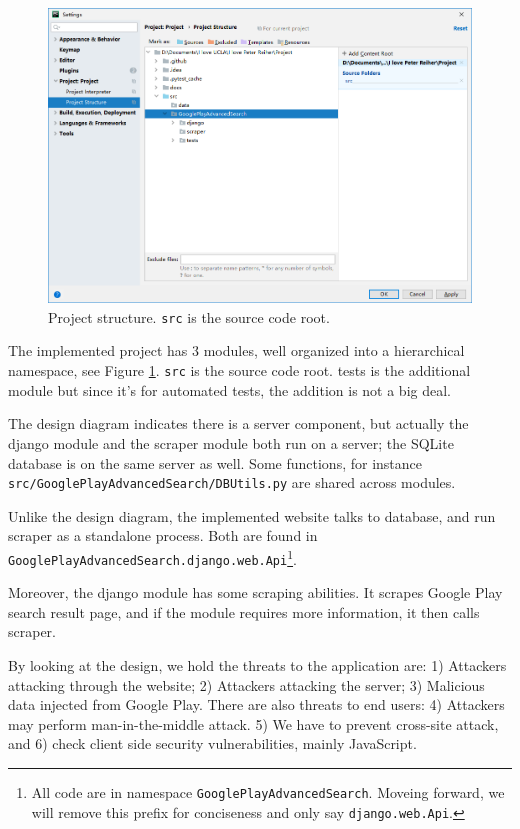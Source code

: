 \documentclass[12pt, a4paper]{article}
\newcommand{\code}[1]{\texttt{#1}}
\begin{document}
\begin{figure}[ht]
\centering
\includegraphics[width=\textwidth]{project-structure.png}
\caption{Project structure. \code{src} is the source code root.}
\label{fig:project-structure}
\end{figure}

The implemented project has 3 modules, well organized into a hierarchical namespace, see Figure \ref{fig:project-structure}. \code{src} is the source code root. tests is the additional module but since it's for automated tests, the addition is not a big deal.

The design diagram indicates there is a server component, but actually the django module and the scraper module both run on a server; the SQLite database is on the same server as well. Some functions, for instance \code{src/GooglePlayAdvancedSearch/DBUtils.py} are shared across modules. 

Unlike the design diagram, the implemented website talks to database, and run scraper as a standalone process. Both are found in \linebreak[4]
\code{GooglePlayAdvancedSearch\linebreak[0].django.web.Api}\footnote{All code are in namespace \code{GooglePlayAdvancedSearch}. Moveing forward, we will remove this prefix for conciseness and only say \code{django.web.Api}.}.

Moreover, the django module has some scraping abilities. It scrapes Google Play search result page, and if the module requires more information, it then calls scraper.

By looking at the design, we hold the threats to the application are: 1) Attackers attacking through the website; 2) Attackers attacking the server; 3) Malicious data injected from Google Play. There are also threats to end users: 4) Attackers may perform man-in-the-middle attack. 5) We have to prevent cross-site attack, and 6) check client side security vulnerabilities, mainly JavaScript.
\end{document}
